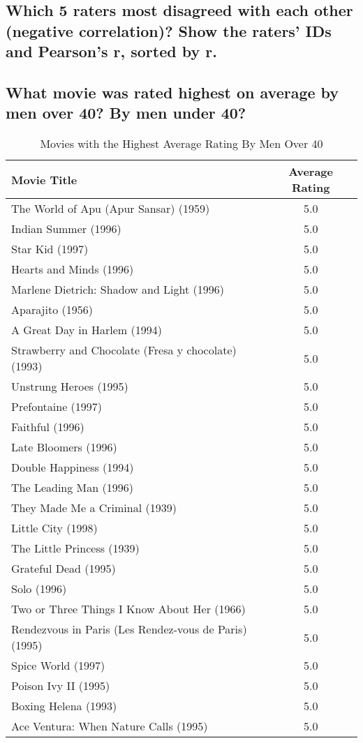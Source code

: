 \documentclass{article}
\begin{document}
\newpage
\subsection{Which 5 raters most disagreed with each other (negative correlation)? Show the raters' IDs and Pearson's r, sorted by r.}

\newpage
\subsection{What movie was rated highest on average by men over 40? By men under 40?}

\begin{table}[!h]
\centering
\begin{tabular}{l c}
Movie Title & Average Rating \\
\hline
The World of Apu (Apur Sansar) (1959) & 5.0 \\
Indian Summer (1996) & 5.0 \\
Star Kid (1997) & 5.0 \\
Hearts and Minds (1996) & 5.0 \\
Marlene Dietrich: Shadow and Light (1996)  & 5.0 \\
Aparajito (1956) & 5.0 \\
A Great Day in Harlem (1994) & 5.0 \\
Strawberry and Chocolate (Fresa y chocolate) (1993) & 5.0 \\
Unstrung Heroes (1995) & 5.0 \\
Prefontaine (1997) & 5.0 \\
Faithful (1996) & 5.0 \\
Late Bloomers (1996) & 5.0 \\
Double Happiness (1994) & 5.0 \\
The Leading Man (1996) & 5.0 \\
They Made Me a Criminal (1939) & 5.0 \\
Little City (1998) & 5.0 \\
The Little Princess (1939) & 5.0 \\
Grateful Dead (1995) & 5.0 \\
Solo (1996) & 5.0 \\
Two or Three Things I Know About Her (1966) & 5.0 \\
Rendezvous in Paris (Les Rendez-vous de Paris) (1995) & 5.0 \\
Spice World (1997) & 5.0 \\
Poison Ivy II (1995) & 5.0 \\
Boxing Helena (1993) & 5.0 \\
Ace Ventura: When Nature Calls (1995) & 5.0 \\
\hline
\end{tabular}
\caption{Movies with the Highest Average Rating By Men Over 40}
\end{table}
\end{document}
